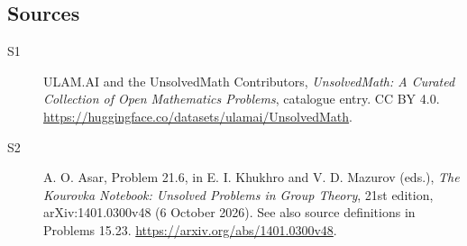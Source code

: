 \documentclass[11pt]{article}
\begin{document}
\subsection{Sources}
\begin{description}
\item[\hypertarget{source:statement:1}{S1}] ULAM.AI and the UnsolvedMath Contributors, \emph{UnsolvedMath: A Curated Collection of Open Mathematics Problems}, catalogue entry. CC BY 4.0. \url{https://huggingface.co/datasets/ulamai/UnsolvedMath}.
\item[\hypertarget{source:statement:2}{S2}] A. O. Asar, Problem 21.6, in E. I. Khukhro and V. D. Mazurov (eds.), \emph{The Kourovka Notebook: Unsolved Problems in Group Theory}, 21st edition, arXiv:1401.0300v48 (6 October 2026). See also source definitions in Problems 15.23. \url{https://arxiv.org/abs/1401.0300v48}.
\end{description}
\label{end:statement}
\end{document}

